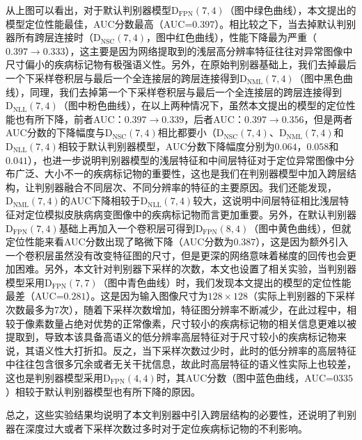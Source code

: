 从上图可以看出，对于默认判别器模型$\mathrm{D}_\mathrm{FPN}(7,4)$（图中绿色曲线），本文提出的模型定位性能最佳，AUC分数最高（AUC=$0.397$）。相比较之下，当去掉默认判别器所有跨层连接时（$\mathrm{D}_\mathrm{NSC}(7,4)$，图中红色曲线），性能下降最为严重（$0.397\rightarrow 0.333$），这主要是因为网络提取到的浅层高分辨率特征往往对异常图像中尺寸偏小的疾病标记物有极强语义性。另外，在原始判别器基础上，我们去掉最后一个下采样卷积层与最后一个全连接层的跨层连接得到$\mathrm{D}_\mathrm{NML}(7,4)$（图中黑色曲线），同理，我们去掉第一个下采样卷积层与最后一个全连接层的跨层连接得到$\mathrm{D}_\mathrm{NLL}(7,4)$（图中粉色曲线），在以上两种情况下，虽然本文提出的模型的定位性能也有所下降，前者AUC：$0.397\rightarrow 0.339$，后者AUC：$0.397\rightarrow 0.356$，但是两者AUC分数的下降幅度与$\mathrm{D}_\mathrm{NSC}(7,4)$相比都要小（$\mathrm{D}_\mathrm{NSC}(7,4)$、$\mathrm{D}_\mathrm{NML}(7,4)$和$\mathrm{D}_\mathrm{NLL}(7,4)$相较于默认判别器模型，AUC分数下降幅度分别为$0.064$，$0.058$和$0.041$），也进一步说明判别器模型的浅层特征和中间层特征对于定位异常图像中分布广泛、大小不一的疾病标记物的重要性，这也是我们在判别器模型中加入跨层结构，让判别器融合不同层次、不同分辨率的特征的主要原因。我们还能发现，$\mathrm{D}_\mathrm{NML}(7,4)$的AUC下降相较于$\mathrm{D}_\mathrm{NLL}(7,4)$较大，这说明中间层特征相比浅层特征对定位模拟皮肤病病变图像中的疾病标记物而言更加重要。另外，在默认判别器$\mathrm{D}_\mathrm{FPN}(7,4)$基础上再加入一个卷积层可得到$\mathrm{D}_\mathrm{FPN}(8,4)$（图中黄色曲线），但就定位性能来看AUC分数出现了略微下降（AUC分数为$0.387$），这是因为额外引入一个卷积层虽然没有改变特征图的尺寸，但是更深的网络意味着梯度的回传也会更加困难。另外，本文针对判别器下采样的次数，本文也设置了相关实验，当判别器模型采用$\mathrm{D}_\mathrm{FPN}(7,7)$（图中青色曲线）时，我们发现本文提出的模型的定位性能最差（AUC=$0.281$）。这是因为输入图像尺寸为$128\times 128$（实际上判别器的下采样次数最多为$7$次），随着下采样次数增加，特征图分辨率不断减少，在此过程中，相较于像素数量占绝对优势的正常像素，尺寸较小的疾病标记物的相关信息更难以被提取到，导致本该具备高语义的低分辨率高层特征对于尺寸较小的疾病标记物来说，其语义性大打折扣。反之，当下采样次数过少时，此时的低分辨率的高层特征中往往包含很多冗余或者无关干扰信息，故此时高层特征的语义性实际上也较差，这也是判别器模型采用$\mathrm{D}_\mathrm{FPN}(4,4)$时，其AUC分数（图中蓝色曲线，AUC=$0335$）相较于默认判别器模型也有所下降的原因。

总之，这些实验结果均说明了本文判别器中引入跨层结构的必要性，还说明了判别器在深度过大或者下采样次数过多时对于定位疾病标记物的不利影响。

